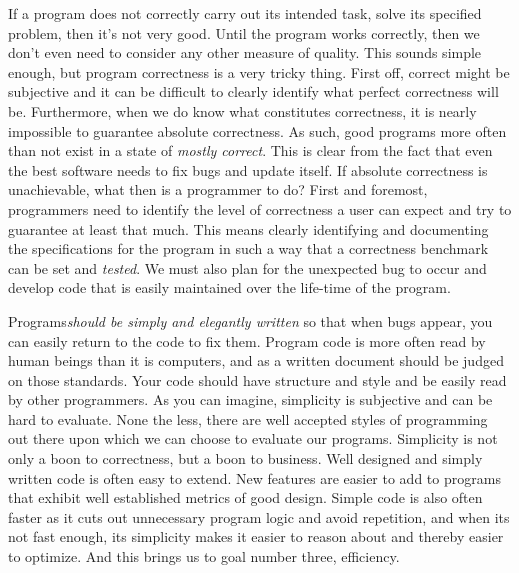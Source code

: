 \documentclass[]{tufte-handout}
\begin{document}
If a program does not correctly carry out its intended task, solve its specified problem, then it's not very good. Until the program works correctly, then we don't even need to consider any other measure of quality.  This sounds simple enough, but program correctness is a very tricky thing.  First off, correct might be subjective and it can be difficult to clearly identify what perfect correctness will be.  Furthermore, when we do know what constitutes correctness, it is nearly impossible to guarantee absolute correctness.  As such, good programs more often than not exist in a state of \textit{mostly correct}.  This is clear from the fact that even the best software needs to fix bugs and update itself. If absolute correctness is unachievable, what then is a programmer to do? First and foremost, programmers need to identify the level of correctness a user can expect and try to guarantee at least that much. This means clearly identifying and documenting the specifications for the program in such a way that a correctness benchmark can be set and \textit{tested}.  We must also plan for the unexpected bug to occur and develop code that is easily maintained over the life-time of the program. 

Programs\textit{should be simply and elegantly written} so that when bugs appear, you can easily return to the code to fix them.  Program code is more often read by human beings than it is computers, and as a written document should be judged on those standards.  Your code should have structure and style and be easily read by other programmers.  As you can imagine, simplicity is subjective and can be hard to evaluate.  None the less, there are well accepted styles of programming out there upon which we can choose to evaluate our programs. Simplicity is not only a boon to correctness, but a boon to business. Well designed and simply written code is often easy to extend. New features are easier to add to programs that exhibit well established metrics of good design. Simple code is also often faster as it cuts out unnecessary program logic and avoid repetition, and when its not fast enough, its simplicity makes it easier to reason about and thereby easier to optimize. And this brings us to goal number three, efficiency.
\end{document}
